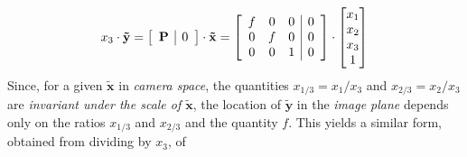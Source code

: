 \begin{equation*}
\begin{split}
x_3\cdot\mathbf{\tilde{y}}
=
\left[\begin{array}{c|c}\mathbf{P} & 0\end{array}\right]\cdot\mathbf{\tilde{x}}
=
\left[\begin{array}{ccc|c}
f & 0 & 0 & 0\\
0 & f & 0 & 0\\
0 & 0 & 1 & 0\\
\end{array}\right]
\cdot\begin{bmatrix}x_1\\x_2\\x_3\\1\end{bmatrix}
\end{split}
\end{equation*}%
Since, for a given $\mathbf{\tilde{x}}$ in \textit{camera space}, the quantities 
$x_{1/3}=x_1/x_3$ and $x_{2/3}=x_2/x_3$ 
are \textit{invariant under the scale of $\mathbf{\tilde{x}}$}, 
the location of $\mathbf{\tilde{y}}$ in the \textit{image plane} depends only on the ratios $x_{1/3}$ and $x_{2/3}$ and the quantity $f$. This yields a similar form, obtained from dividing by $x_3$, of

